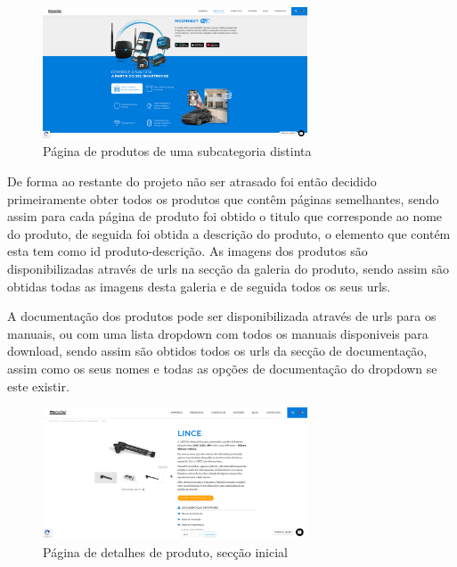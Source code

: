 \begin{figure}[htb]
    \centering
    
    \includegraphics[width=0.7\textwidth]{images/implementacao/scraper/pagina_mconnect.png}
    \caption{Página de produtos de uma subcategoria distinta}
    \label{fig:52}
\end{figure}

De forma ao restante do projeto não ser atrasado foi então decidido primeiramente obter todos os produtos que contêm páginas semelhantes,
sendo assim para cada página de produto foi obtido o titulo que corresponde ao nome do produto, de seguida foi obtida a descrição do produto,
o elemento que contém esta tem como id produto-descrição. As imagens dos produtos são disponibilizadas através de urls na secção da galeria do produto, sendo assim são obtidas todas as imagens desta
galeria e de seguida todos os seus urls.

A documentação dos produtos pode ser disponibilizada através de urls para os manuais,
ou com uma lista dropdown com todos os manuais disponiveis para download, sendo assim são obtidos todos os urls da secção de documentação, 
assim como os seus nomes e todas as opções de documentação do dropdown se este existir.

\begin{figure}[htb]
    \centering
    
    \includegraphics[width=0.7\textwidth]{images/implementacao/scraper/pagina_detalhes_produto.png}
    \caption{Página de detalhes de produto, secção inicial}
    \label{fig:53}
\end{figure}

